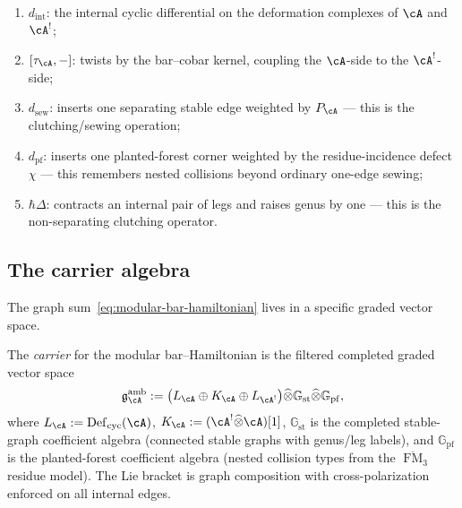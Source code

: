 \begin{remark}
\label{rem:five-pieces-meaning}
\begin{enumerate}[label=\textup{(\roman*)}]
\item $d_{\mathrm{int}}$: the internal cyclic differential on the
deformation complexes of $\cA$ and $\cA^!$;
\item $[\tau_{\cA},-]$: twists by the bar--cobar kernel, coupling
the $\cA$-side to the $\cA^!$-side;
\item $d_{\mathrm{sew}}$: inserts one separating stable edge
weighted by $P_{\cA}$ --- this is the clutching/sewing operation;
\item $d_{\mathrm{pf}}$: inserts one planted-forest corner weighted
by the residue-incidence defect $\chi$ --- this remembers nested
collisions beyond ordinary one-edge sewing;
\item $\hbar\Delta$: contracts an internal pair of legs and raises
genus by one --- this is the non-separating clutching operator.
\end{enumerate}
\end{remark}

\subsection{The carrier algebra}
\label{subsec:carrier-algebra}

The graph sum~\eqref{eq:modular-bar-hamiltonian} lives in a specific
graded vector space.

\begin{definition}
\label{def:ambient-modular-complementarity-algebra}
The \emph{carrier} for the modular bar--Hamiltonian is the filtered
completed graded vector space
\begin{equation}
\label{eq:ambient-modular-complementarity-algebra}
\mathfrak{g}^{\mathrm{amb}}_{\cA}
:=
\bigl(L_{\cA} \oplus K_{\cA} \oplus L_{\cA^!}\bigr)
\widehat\otimes \mathbb{G}_{\mathrm{st}}
\widehat\otimes \mathbb{G}_{\mathrm{pf}},
\end{equation}
where $L_{\cA} := \operatorname{Def}_{\mathrm{cyc}}(\cA)$,
$K_{\cA} := (\cA^!\widehat\otimes\cA)[1]$,
$\mathbb{G}_{\mathrm{st}}$ is the completed stable-graph coefficient
algebra (connected stable graphs with genus/leg labels), and
$\mathbb{G}_{\mathrm{pf}}$ is the planted-forest coefficient algebra
(nested collision types from the $\overline{\operatorname{FM}}_3$
residue model).  The Lie bracket is graph composition with
cross-polarization enforced on all internal edges.
\end{definition}


